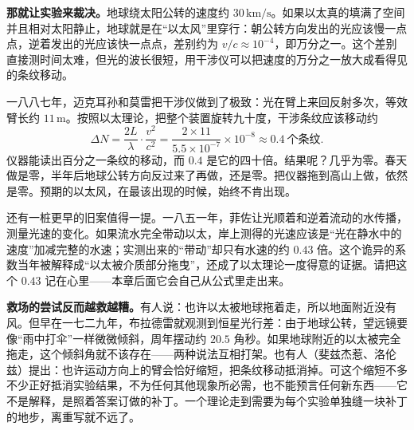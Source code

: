 \textbf{那就让实验来裁决。}地球绕太阳公转的速度约 \(30\,\mathrm{km/s}\)。如果以太真的填满了空间并且相对太阳静止，地球就是在“以太风”里穿行：朝公转方向发出的光应该慢一点点，逆着发出的光应该快一点点，差别约为 \(v/c\approx 10^{-4}\)，即万分之一。这个差别直接测时间太难，但光的波长很短，用干涉仪可以把速度的万分之一放大成看得见的条纹移动。

一八八七年，迈克耳孙和莫雷把干涉仪做到了极致：光在臂上来回反射多次，等效臂长约 \(11\,\mathrm{m}\)。按照以太理论，把整个装置旋转九十度，干涉条纹应该移动约
\[
\Delta N=\frac{2L}{\lambda}\cdot\frac{v^{2}}{c^{2}}
=\frac{2\times11}{5.5\times10^{-7}}\times10^{-8}\approx 0.4\ \text{个条纹}.
\]
仪器能读出百分之一条纹的移动，而 \(0.4\) 是它的四十倍。结果呢？几乎为零。春天做是零，半年后地球公转方向反过来了再做，还是零。把仪器拖到高山上做，依然是零。预期的以太风，在最该出现的时候，始终不肯出现。

还有一桩更早的旧案值得一提。一八五一年，菲佐让光顺着和逆着流动的水传播，测量光速的变化。如果流水完全带动以太，岸上测得的光速应该是“光在静水中的速度”加减完整的水速；实测出来的“带动”却只有水速的约 \(0.43\) 倍。这个诡异的系数当年被解释成“以太被介质部分拖曳”，还成了以太理论一度得意的证据。请把这个 \(0.43\) 记在心里——本章后面它会自己从公式里走出来。

\begin{center}
\end{center}

\textbf{救场的尝试反而越救越糟。}有人说：也许以太被地球拖着走，所以地面附近没有风。但早在一七二九年，布拉德雷就观测到恒星光行差：由于地球公转，望远镜要像“雨中打伞”一样微微倾斜，周年摆动约 \(20.5\) 角秒。如果地球附近的以太被完全拖走，这个倾斜角就不该存在——两种说法互相打架。也有人（斐兹杰惹、洛伦兹）提出：也许运动方向上的臂会恰好缩短，把条纹移动抵消掉。可这个缩短不多不少正好抵消实验结果，不为任何其他现象所必需，也不能预言任何新东西——它不是解释，是照着答案订做的补丁。一个理论走到需要为每个实验单独缝一块补丁的地步，离重写就不远了。

